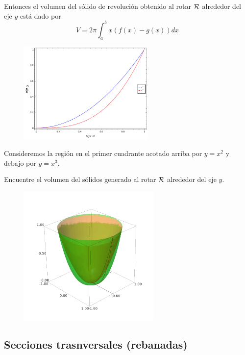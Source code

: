 Entonces el volumen del s\'olido de revoluci\'on obtenido al rotar $\mathcal{R}$ alrededor del eje $y$ está dado por
\[
 \label{FDC}
 \tag{FDC}
 V=2\pi\int_{a}^{b}x\left( f(x)-g(x) \right)dx
\]




\begin{resuelto}
\begin{figure}
 \centering
 \includegraphics[height=5cm,keepaspectratio=true]{./calculo/sage0507.png}
 \label{fig:sage:0507}
\end{figure}


 Consideremos la regi\'on en el primer cuadrante acotado arriba por $y=x^{2}$ y debajo por $y=x^{3}.$

Encuentre el volumen del s\'olidos generado al rotar $\mathcal{R}$ alrededor del eje $y.$
\end{resuelto}




\begin{figure}
 \centering
 \includegraphics[height=7cm,keepaspectratio=true]{./calculo/sage0508.png}
 \label{fig:sage:0508}
\end{figure}



\subsection{Secciones trasnversales (rebanadas)}


